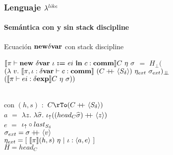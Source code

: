 \documentclass{beamer}
\begin{document}
\begin{frame}

\frametitle{Lenguaje $\lambda^{like}$}
\framesubtitle{Semántica con y sin stack discipline}

\begin{block}{Ecuación $\textbf{new} \delta \textbf{var}$ con stack discipline}

$\llbracket \pi \vdash \textbf{new} \ \delta \textbf{var} \ \iota \ \textbf{:=} \ ei \ \textbf{in} \ c : \textbf{comm} \rrbracket C \ \eta \ \sigma$ 
$=$ $H_{\bot} ($\\ 
\quad \quad 
$(\lambda \ v . \ \semBrcks{\pi,\iota:\deltavar \vdash c : \commt}
		\ (C\concat\lrangles{S_\delta}) \ \eta_{ext} \ \sigma_{ext})_{\dbot}$ \\ 
\quad \quad \quad \quad \quad \quad \quad \quad \quad \quad 
\quad \quad \quad \quad \quad \quad \quad 
$(\llbracket \pi \vdash ei : \delta \textbf{exp} \rrbracket C \ \eta \ \sigma))$\\

\

con $(h,s)$ $:$ $C \rTo (C \concat \lrangles{S_\delta})$ \\
\quad \quad 
$a$ $=$ $\lambda z. \ \lambda \widehat{\sigma} . \ \iota_{\uparrow} ((head_{C} \widehat{\sigma}) +\kern-1.3ex+\kern0.8ex \langle z \rangle)$\\
\quad \quad 
$e$ $=$ $ \iota_{\uparrow} \circ last_{S_\delta}$\\
\quad \quad 
$\sigma_{ext} = \sigma +\kern-1.3ex+\kern0.8ex \langle v \rangle $\\
\quad \quad 
$\eta_{ext} = [ \ \semBrcks{\pi}(h,s) \ \eta \ | \ \iota:\lrangles{a,e} \ ]$\\
\quad \quad 
$H = head_C$

\end{block}

\end{frame}
\end{document}
